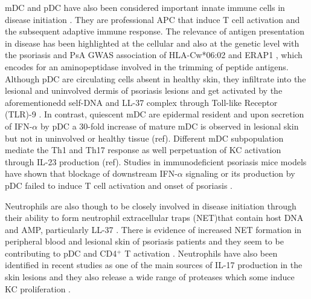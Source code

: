 {mDC and pDC have also been considered important innate immune cells in disease initiation \parencite{Mahil20016}. They are professional APC that induce T cell activation and the subsequent adaptive immune response. The relevance of antigen presentation in disease has been highlighted at the cellular \parencite{Rusell1972, Tiilikainen1980} and also at the genetic level with the psoriasis and PsA GWAS association of HLA-Cw*06:02 and ERAP1 \parencite{Strange2010}, which encodes for an aminopeptidase involved in the trimming of peptide antigens. Although pDC are circulating cells absent in healthy skin, they infiltrate into the lesional and uninvolved dermis of psoriasis lesions \parencite{Nestle2005} and get activated by the aforementionedd self-DNA and LL-37 complex through Toll-like Receptor (TLR)-9 \parencite{Lande2007}. In contrast, quiescent mDC are epidermal resident and upon secretion of IFN-$\alpha$ by pDC a 30-fold increase of mature mDC is observed in lesional skin but not in uninvolved or healthy tissue (ref). Different mDC subpopulation mediate the Th1 and Th17 response as well perpetuation of KC activation through IL-23 production (ref). Studies in immunodeficient psoriasis mice models have shown that blockage of downstream  IFN-$\alpha$ signaling or its production by pDC failed to induce T cell activation and onset of psoriasis \parencite{Nestle2005}. 

Neutrophils are also though to be closely involved in disease initiation through their ability to form neutrophil extracellular traps (NET)that contain host DNA and AMP, particularly LL-37 \parencite{Hu2016}. There is evidence of increased NET formation in peripheral blood and lesional skin of psoriasis patients and they seem to be contributing to pDC and CD4$^+$ T activation \parencite{Hu2016}. Neutrophils have also been identified in recent studies as one of the main sources of IL-17 production in the skin lesions \parencite{Lin2011} and they also release a wide range of proteases which some induce KC proliferation \parencite{Mahil2006}.

}
